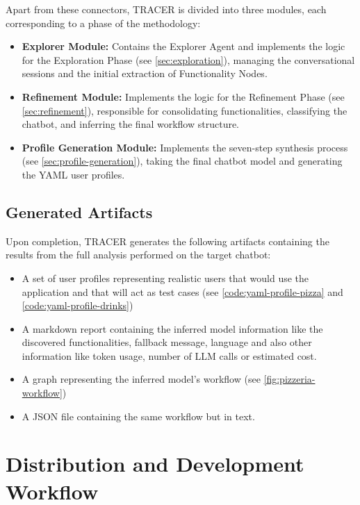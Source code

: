 Apart from these connectors,
\ac{TRACER} is divided into three modules,
each corresponding to a phase of the methodology:

\begin{itemize}
  \item \textbf{Explorer Module:}
    Contains the Explorer Agent
    and implements the logic for the Exploration Phase (see \autoref{sec:exploration}),
    managing the conversational sessions and the initial extraction of Functionality Nodes.

  \item \textbf{Refinement Module:}
    Implements the logic for the Refinement Phase (see \autoref{sec:refinement}),
    responsible for consolidating functionalities,
    classifying the chatbot, and inferring the final workflow structure.

  \item \textbf{Profile Generation Module:}
    Implements the seven-step synthesis process (see \autoref{sec:profile-generation}),
    taking the final chatbot model and generating the YAML user profiles.
\end{itemize}

\subsection{Generated Artifacts}

Upon completion, \ac{TRACER} generates the following artifacts
containing the results from the full analysis performed on the target chatbot:

\begin{itemize}
  \item A set of user profiles
    representing realistic users that would use the application
    and that will act as test cases
    (see \autoref{code:yaml-profile-pizza} and \autoref{code:yaml-profile-drinks})
  \item A markdown report containing the inferred model information like
    the discovered functionalities, fallback message, language
    and also other information like token usage, number of \ac{LLM} calls or estimated cost.
  \item A graph representing the inferred model's workflow (see \autoref{fig:pizzeria-workflow})
  \item A JSON file containing the same workflow but in text.
\end{itemize}



\section{Distribution and Development Workflow}

